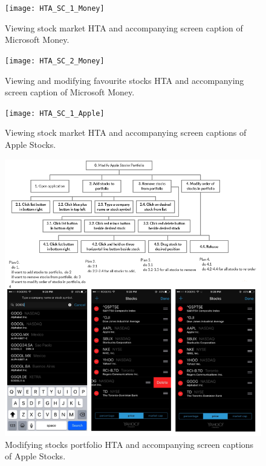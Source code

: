 \documentclass{sigchi}
\begin{document}
\begin{figure}
	\texttt{[image: HTA\_SC\_1\_Money]}
	\caption{Viewing stock market HTA and accompanying screen caption of Microsoft Money.}
	\label{fig:figure1}
\end{figure}

\begin{figure}
	\texttt{[image: HTA\_SC\_2\_Money]}
	\caption{Viewing and modifying favourite stocks HTA and accompanying screen caption of Microsoft Money.}
	\label{fig:figure2}
\end{figure}

\begin{figure}
	\begin{center}
		\texttt{[image: HTA\_SC\_1\_Apple]}
	\end{center}
	\caption{Viewing stock market HTA and accompanying screen captions of Apple Stocks.}
	\label{fig:figure3}
\end{figure}

\begin{figure}
	\includegraphics[width=\textwidth]{HTA_SC_2_Apple}
	\caption{Modifying stocks portfolio HTA and accompanying screen captions of Apple Stocks.}
	\label{fig:figure4}
\end{figure}
\end{document}
